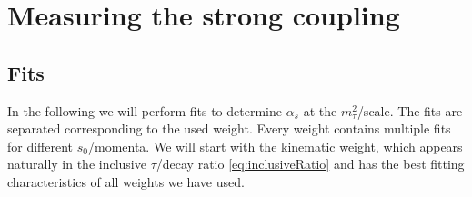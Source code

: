 \documentclass[../../index.tex]{subfiles}
\begin{document}
\chapter{Measuring the strong coupling}

\section{Fits}
In the following we will perform fits to determine $\alpha_s$ at the
$m_\tau^2$\-/scale. The fits are separated corresponding to the used weight. Every
weight contains multiple fits for different $s_0$\-/momenta. We will start with
the kinematic weight, which appears naturally in the inclusive $\tau$\-/decay
ratio \cref{eq:inclusiveRatio} and has the best fitting characteristics of all
weights we have used.
\end{document}
